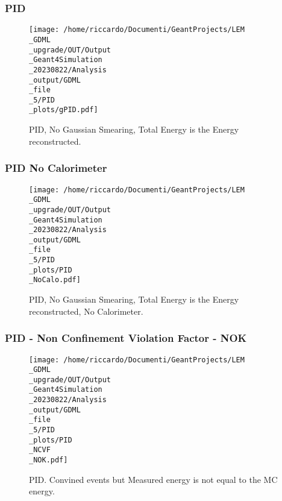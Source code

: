 \documentclass[8pt]{beamer}
\begin{document}
\begin{frame}
\begin{table}
\begin{tabular}{lll}
            \bottomrule
            \end{tabular}
            \end{table}
            
            \end{frame}
            
            \begin{frame}
                \frametitle{PID}
            
        \begin{figure}[h]
            \centering
            \texttt{[image: /home/riccardo/Documenti/GeantProjects/LEM\\\_GDML\\\_upgrade/OUT/Output\\\_Geant4Simulation\\\_20230822/Analysis\\\_output/GDML\\\_file\\\_5/PID\\\_plots/gPID.pdf]}
            \caption{PID, No Gaussian Smearing, Total Energy is the Energy reconstructed.}
        \end{figure}
        
            \end{frame}
            
            \begin{frame}
                \frametitle{PID No Calorimeter}
            
        \begin{figure}[h]
            \centering
            \texttt{[image: /home/riccardo/Documenti/GeantProjects/LEM\\\_GDML\\\_upgrade/OUT/Output\\\_Geant4Simulation\\\_20230822/Analysis\\\_output/GDML\\\_file\\\_5/PID\\\_plots/PID\\\_NoCalo.pdf]}
            \caption{PID, No Gaussian Smearing, Total Energy is the Energy reconstructed, No Calorimeter.}
        \end{figure}
        
            \end{frame}
            
            \begin{frame}
                \frametitle{PID - Non Confinement Violation Factor - NOK}
            
        \begin{figure}[h]
            \centering
            \texttt{[image: /home/riccardo/Documenti/GeantProjects/LEM\\\_GDML\\\_upgrade/OUT/Output\\\_Geant4Simulation\\\_20230822/Analysis\\\_output/GDML\\\_file\\\_5/PID\\\_plots/PID\\\_NCVF\\\_NOK.pdf]}
            \caption{PID. Convined events but Measured energy is not equal to the MC energy.}
        \end{figure}
        
            \end{frame}
            
\end{document}
